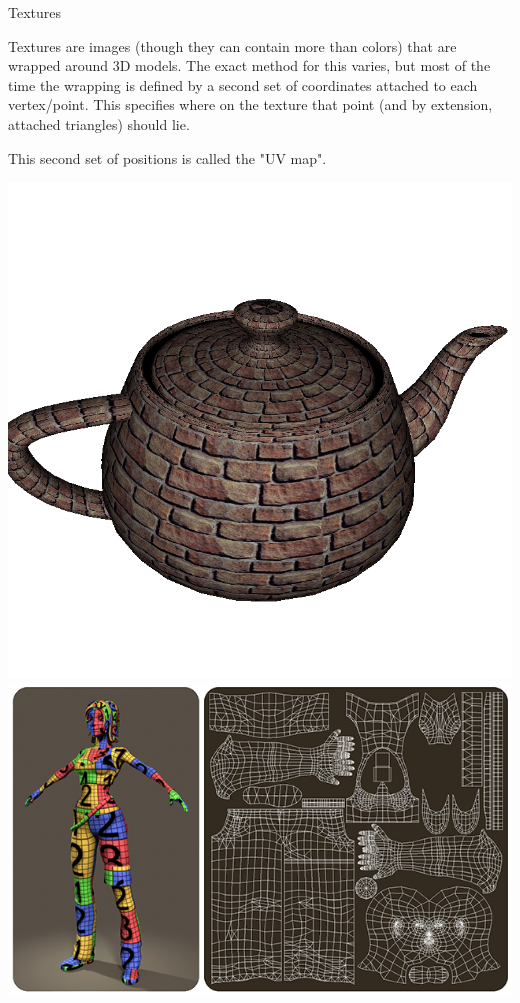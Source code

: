 \documentclass{lug}
\newcommand{\splitslide}[4]{
    \noindent
    \begin{minipage}{#1 \textwidth - #2 }
        #3
    \end{minipage}%
    \hspace{ \dimexpr #2 * 2 \relax }%
    \begin{minipage}{\textwidth - #1 \textwidth - #2 }
        #4
    \end{minipage}
}
\begin{document}
\begin{frame}{Textures}
    \splitslide{0.65}{.7em}{
        \small

         Textures are images (though they can contain more than colors) that
         are wrapped around 3D models. The exact method for this varies, but
         most of the time the wrapping is defined by a second set of
         coordinates attached to each vertex/point. This specifies where on
         the texture that point (and by extension, attached triangles) should
         lie.

         \vspace{1ex}

         This second set of positions is called the "UV map".

    }{
        \includegraphics[width=\textwidth]{graphics/teapot_brick} \\
        \includegraphics[width=\textwidth]{graphics/uv_map}
    }
\end{frame}
\end{document}
